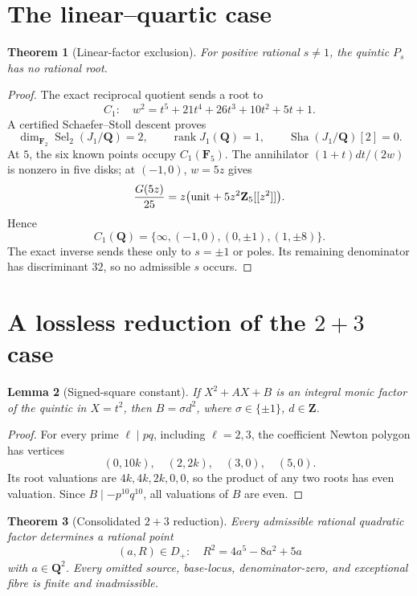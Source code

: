 \documentclass[11pt]{article}
\newtheorem{theorem}{Theorem}
\newtheorem{lemma}[theorem]{Lemma}
\newcommand{\Q}{\mathbf Q}
\begin{document}
\section{The linear--quartic case}

\begin{theorem}[Linear-factor exclusion]\label{thm:linear}
For positive rational \(s\ne1\), the quintic \(P_s\) has no rational root.
\end{theorem}

\begin{proof}
The exact reciprocal quotient sends a root to
\[
 C_1:\quad w^2=t^5+21t^4+26t^3+10t^2+5t+1.
\]
A certified Schaefer--Stoll descent proves
\[
 \dim_{\mathbf F_2}\operatorname{Sel}_2(J_1/\Q)=2,\qquad
 \operatorname{rank}J_1(\Q)=1,\qquad
 \operatorname{Sha}(J_1/\Q)[2]=0.
\]
At \(5\), the six known points occupy \(C_1(\mathbf F_5)\).
The annihilator \((1+t)dt/(2w)\) is nonzero in five disks; at
\((-1,0)\), \(w=5z\) gives
\[
 \frac{G(5z)}{25}
 =z\bigl(\text{\rm unit}+5z^2\mathbf Z_5[[z^2]]\bigr).
\]
Hence
\[
 C_1(\Q)=\{\infty,(-1,0),(0,\pm1),(1,\pm8)\}.
\]
The exact inverse sends these only to \(s=\pm1\) or poles.  Its remaining
denominator has discriminant \(32\), so no admissible \(s\) occurs.
\end{proof}

\section{A lossless reduction of the \(2+3\) case}

\begin{lemma}[Signed-square constant]\label{lem:square}
If \(X^2+AX+B\) is an integral monic factor of the quintic in \(X=t^2\),
then \(B=\sigma d^2\), where \(\sigma\in\{\pm1\}\), \(d\in\mathbf Z\).
\end{lemma}

\begin{proof}
For every prime \(\ell\mid pq\), including \(\ell=2,3\), the coefficient
Newton polygon has vertices
\[
(0,10k),\quad(2,2k),\quad(3,0),\quad(5,0).
\]
Its root
valuations are \(4k,4k,2k,0,0\), so the product of any two roots has even
valuation.  Since \(B\mid-p^{10}q^{10}\), all valuations of \(B\) are even.
\end{proof}

\begin{theorem}[Consolidated \(2+3\) reduction]\label{thm:reduction}
Every admissible rational quadratic factor determines a rational point
\[
 (a,R)\in D_+:\quad R^2=4a^5-8a^2+5a
\]
with \(a\in\Q^2\).  Every omitted source, base-locus, denominator-zero, and
exceptional fibre is finite and inadmissible.
\end{theorem}
\end{document}

